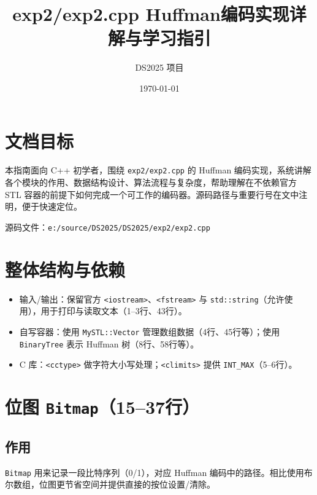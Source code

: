 \documentclass[12pt]{article}
\title{exp2/exp2.cpp Huffman编码实现详解与学习指引}
\author{DS2025 项目}
\date{\today}
\begin{document}
\maketitle

\section*{文档目标}
本指南面向 C++ 初学者，围绕 \texttt{exp2/exp2.cpp} 的 Huffman 编码实现，系统讲解各个模块的作用、数据结构设计、算法流程与复杂度，帮助理解在不依赖官方 STL 容器的前提下如何完成一个可工作的编码器。源码路径与重要行号在文中注明，便于快速定位。\newline

源码文件：\texttt{e:/source/DS2025/DS2025/exp2/exp2.cpp}

\section{整体结构与依赖}
\begin{itemize}[leftmargin=1.4em]
  \item 输入/输出：保留官方 \texttt{<iostream>}、\texttt{<fstream>} 与 \texttt{std::string}（允许使用），用于打印与读取文本（1--3行、43行）。
  \item 自写容器：使用 \texttt{MySTL::Vector} 管理数组数据（4行、45行等）；使用 \texttt{BinaryTree} 表示 Huffman 树（8行、58行等）。
  \item C 库：\texttt{<cctype>} 做字符大小写处理；\texttt{<climits>} 提供 \texttt{INT\_MAX}（5--6行）。
\end{itemize}

\section{位图 \texttt{Bitmap}（15--37行）}
\subsection*{作用}
\texttt{Bitmap} 用来记录一段比特序列（0/1），对应 Huffman 编码中的路径。相比使用布尔数组，位图更节省空间并提供直接的按位设置/清除。
\end{document}
